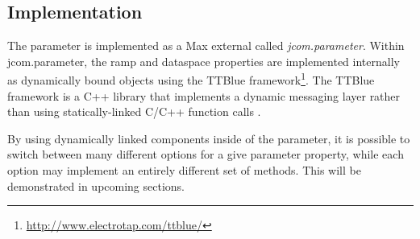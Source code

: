\documentclass{article}
\begin{document}
\subsection{Implementation} %



The parameter is implemented as a Max external called \emph{jcom.parameter}. Within jcom.parameter, the ramp and dataspace properties are implemented internally as dynamically bound objects using the TTBlue framework\footnote{\url{http://www.electrotap.com/ttblue/}}.  The TTBlue framework is a C++ library that implements a dynamic messaging layer rather than using statically-linked C/C++ function calls \cite{Place:2008ttblue}.  

By using dynamically linked components inside of the parameter, it is possible to switch between many different options for a give parameter property, while each option may implement an entirely different set of methods.  This will be demonstrated in upcoming sections.




%
%
%
%
%
\end{document}
